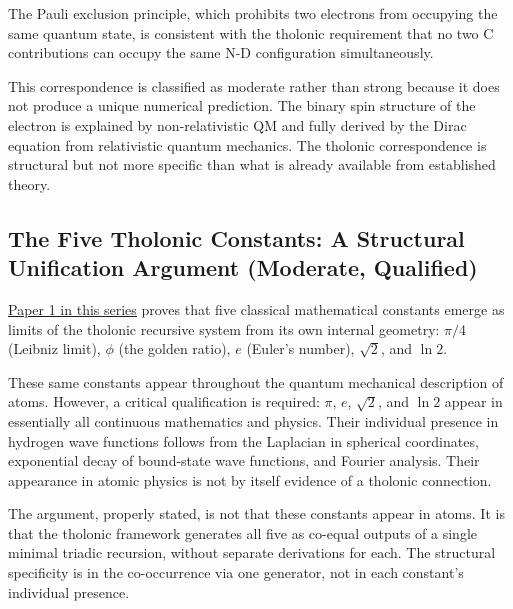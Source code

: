 \documentclass[12pt]{article}
\begin{document}
The Pauli exclusion principle, which prohibits two electrons from
occupying the same quantum state, is consistent with the tholonic
requirement that no two C contributions can occupy the same N-D
configuration simultaneously.

This correspondence is classified as moderate rather than strong because
it does not produce a unique numerical prediction. The binary spin
structure of the electron is explained by non-relativistic QM and fully
derived by the Dirac equation from relativistic quantum mechanics. The
tholonic correspondence is structural but not more specific than what is
already available from established theory.

\subsection{The Five Tholonic Constants: A Structural Unification Argument (Moderate, Qualified)}\label{the-five-tholonic-constants-a-structural-unification-argument-moderate-qualified}

\href{https://github.com/baardev/truevalue/blob/main/docnav/Research/papers/1_recursive-tholonic-five-constants/1_recursive-tholonic-five-constants.pdf}{Paper
1 in this series} proves that five classical mathematical constants
emerge as limits of the tholonic recursive system from its own internal
geometry: \(\pi/4\) (Leibniz limit), \(\phi\) (the golden ratio), \(e\)
(Euler's number), \(\sqrt{2}\), and \(\ln 2\).

These same constants appear throughout the quantum mechanical
description of atoms. However, a critical qualification is required:
\(\pi\), \(e\), \(\sqrt{2}\), and \(\ln 2\) appear in essentially all
continuous mathematics and physics. Their individual presence in
hydrogen wave functions follows from the Laplacian in spherical
coordinates, exponential decay of bound-state wave functions, and
Fourier analysis. Their appearance in atomic physics is not by itself
evidence of a tholonic connection.

The argument, properly stated, is not that these constants appear in
atoms. It is that the tholonic framework generates all five as co-equal
outputs of a single minimal triadic recursion, without separate
derivations for each. The structural specificity is in the co-occurrence
via one generator, not in each constant's individual presence.
\end{document}
